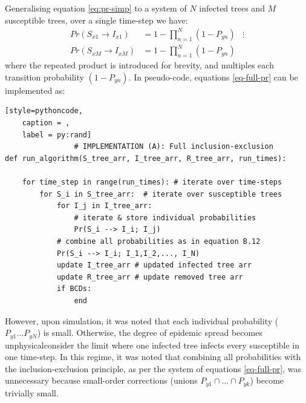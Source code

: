 Generalising equation \ref{eq:pr-simp} to a system of $N$ infected trees and $M$ susceptible trees, over a single time-step we have:
\begin{equation} \label{eq-full-pr}
\begin{split}
Pr(S_{x1} \rightarrow I_{x1}) & = 1 - \prod_{n=1}^{N}(1 - P_{yn})
&\vdots\\
Pr(S_{xM} \rightarrow I_{xM}) & = 1 - \prod_{n=1}^{N}(1 - P_{yn})
\end{split}
\end{equation}
where the repeated product is introduced for brevity, and multiples each transition probability $(1 - P_{yn})$. 
In pseudo-code, equations \ref{eq-full-pr} can be implemented as:
\begin{lstlisting}[style=pythoncode,
    caption = ,
    label = py:rand]
                # IMPLEMENTATION (A): Full inclusion-exclusion
def run_algorithm(S_tree_arr, I_tree_arr, R_tree_arr, run_times):
    
    for time_step in range(run_times): # iterate over time-steps
        for S_i in S_tree_arr:  # iterate over susceptible trees 
            for I_j in I_tree_arr:
                # iterate & store individual probabilities
                Pr(S_i --> I_i; I_j) 
            # combine all probabilities as in equation B.12
            Pr(S_i --> I_i; I_1,I_2,..., I_N)
            update I_tree_arr # updated infected tree arr
            update R_tree_arr # update removed tree arr
            if BCDs:
                end
\end{lstlisting}
However, upon simulation, it was noted that each individual probability ($P_{y1}...P_{yN}$) is small.
Otherwise, the degree of epidemic spread becomes unphysical\textemdash consider the limit where one infected tree infects every susceptible in one time-step. 
In this regime, it was noted that combining all probabilities with the inclusion-exclusion principle, as per the system of equations \ref{eq-full-pr}, was unnecessary
because small-order corrections (unions $P_{y1} \cap ... \cap P_{yk}$) become trivially small. 

